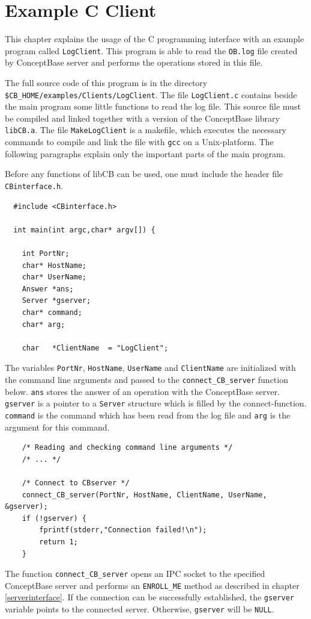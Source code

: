 
\chapter{Example C Client}
\label{cha:logclient}

This chapter explains the usage of the C programming interface
with an example program called {\tt LogClient}. This program
is able to read the {\tt OB.log} file created by ConceptBase server
and performs the operations stored in this file.

The full source code of this program is in the directory
\verb+$CB_HOME/examples/Clients/LogClient+. The file
{\tt LogClient.c} contains beside the main program some little
functions to read the log file. This source file must be compiled
and linked together with a version of the ConceptBase library {\tt libCB.a}.
The file {\tt MakeLogClient} is a makefile, which executes the
necessary commands to compile and link the file with {\tt gcc} on a Unix-platform.
The following paragraphs explain only the important parts of the main program.

Before any functions of libCB can be used, one must include the header
file {\tt CBinterface.h}.
\begin{verbatim}
  #include <CBinterface.h>

  int main(int argc,char* argv[]) {

    int PortNr;
    char* HostName;
    char* UserName;
    Answer *ans;
    Server *gserver;
    char* command;
    char* arg;

    char   *ClientName  = "LogClient";
\end{verbatim}
The variables {\tt PortNr}, {\tt HostName}, {\tt UserName} and {\tt ClientName}
are initialized with the command line arguments and passed to the \verb+connect_CB_server+
function below. {\tt ans} stores the answer of an operation with the ConceptBase
server. {\tt gserver} is a pointer to a {\tt Server} structure which is filled by the
connect-function. {\tt command} is the command which has been read from the log file and
{\tt arg} is the argument for this command.

\begin{verbatim}
    /* Reading and checking command line arguments */
    /* ... */

    /* Connect to CBserver */
    connect_CB_server(PortNr, HostName, ClientName, UserName, &gserver);
    if (!gserver) {
        fprintf(stderr,"Connection failed!\n");
        return 1;
    }
\end{verbatim}
The function \verb+connect_CB_server+ opens an IPC socket to the specified
ConceptBase server and performs an {\tt ENROLL\_ME} method as described in
chapter \ref{serverinterface}.
If the connection can be successfully established, the {\tt gserver} variable
points to the connected server. Otherwise, {\tt gserver} will be {\tt NULL}.

